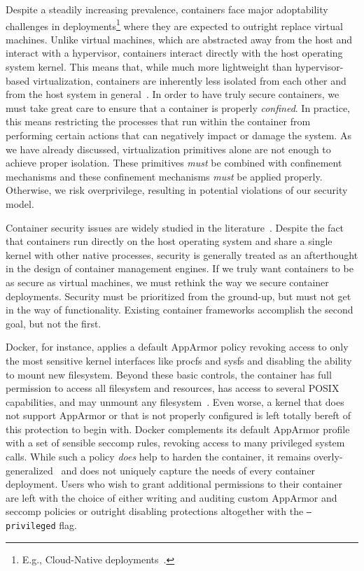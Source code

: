 Despite a steadily increasing prevalence, containers face major adoptability challenges in
deployments\footnote{E.g., Cloud-Native deployments~\cite{brady2020_docker_cloud}.} where
they are expected to outright replace virtual machines. Unlike virtual machines, which are
abstracted away from the host and interact with a hypervisor, containers interact directly
with the host operating system kernel. This means that, while much more lightweight than
hypervisor-based virtualization, containers are inherently less isolated from each other
and from the host system in general~\cite{sultan2019_container_security,
lin2018_container_security, mullinix2020_security_measures, bui2015_docker_analysis}.  In
order to have truly secure containers, we must take great care to ensure that a container
is properly \textit{confined}. In practice, this means restricting the processes that run
within the container from performing certain actions that can negatively impact or damage
the system.  As we have already discussed, virtualization primitives alone are not enough
to achieve proper isolation. These primitives \textit{must} be combined with confinement
mechanisms and these confinement mechanisms \textit{must} be applied properly. Otherwise,
we risk overprivilege, resulting in potential violations of our security model.

Container security issues are widely studied in the
literature~\cite{sultan2019_container_security, lin2018_container_security,
mp2016_hardening, mullinix2020_security_measures, bui2015_docker_analysis}.  Despite the
fact that containers run directly on the host operating system and share a single kernel
with other native processes, security is generally treated as an afterthought in the
design of container management engines. If we truly want containers to be as secure as
virtual machines, we must rethink the way we secure container deployments. Security must
be prioritized from the ground-up, but must not get in the way of functionality. Existing
container frameworks accomplish the second goal, but not the first.

Docker, for instance, applies a default AppArmor policy revoking access to only the most
sensitive kernel interfaces like procfs and sysfs and disabling the ability to mount new
filesystem.  Beyond these basic controls, the container has full permission to access all
filesystem and resources, has access to several POSIX capabilities, and may unmount any
filesystem~\cite{docker_apparmor, docker_default_apparmor}. Even worse, a kernel that does
not support AppArmor or that is not properly configured is left totally bereft of this
protection to begin with. Docker complements its default AppArmor profile with a set of
sensible seccomp rules, revoking access to many privileged system calls. While such
a policy \textit{does} help to harden the container, it remains
overly-generalized~\cite{sultan2019_container_security} and does not uniquely capture the
needs of every container deployment. Users who wish to grant additional permissions to
their container are left with the choice of either writing and auditing custom AppArmor
and seccomp policies or outright disabling protections altogether with the
\texttt{--privileged} flag.

